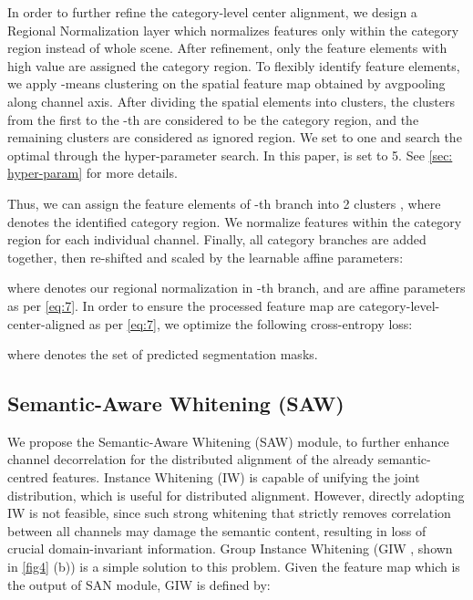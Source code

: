 \documentclass[10pt,twocolumn,letterpaper]{article}
\begin{document}
In order to further refine the category-level center alignment, we design a Regional Normalization layer which normalizes features only within the category region instead of whole scene. After refinement, only the feature elements with high value are assigned the category region. To flexibly identify feature elements, we apply -means clustering on the spatial feature map obtained by avgpooling along channel axis. After dividing the spatial elements into  clusters, the clusters from the first to the -th are considered to be the category region, and the remaining clusters are considered as ignored region. We set  to one and search the optimal  through the hyper-parameter search. In this paper,  is set to 5. See \cref{sec: hyper-param} for more details.

Thus, we can assign the feature elements of -th branch into 2 clusters , where  denotes the identified category region. We normalize features within the category region  for each individual channel. Finally, all category branches are added together, then re-shifted and scaled by the learnable affine parameters:
\vspace{-0.8mm}

where  denotes our regional normalization in -th branch,  and  are affine parameters as per \cref{eq:7}.
In order to ensure the processed feature map  are category-level-center-aligned as per \cref{eq:7}, we optimize the following cross-entropy loss:
\vspace{-0.8mm}

where  denotes the set of predicted segmentation masks.


\subsection{Semantic-Aware Whitening (SAW) \label{subsec:Channel Feature Constraint (CFC)}}












We propose the Semantic-Aware Whitening (SAW) module, to further enhance channel decorrelation for the distributed alignment of the already semantic-centred features.
Instance Whitening (IW) is capable of unifying the joint distribution, which is useful for distributed alignment. However, directly adopting IW is not feasible, since such strong whitening that strictly removes correlation between all channels may damage the semantic content, resulting in loss of crucial domain-invariant information. Group Instance Whitening (GIW \cite{cho2019image}, shown in \cref{fig4} (b)) is a simple solution to this problem. Given the feature map  which is the output of SAN module, GIW is defined by:
\vspace{-0.8mm}
\end{document}
